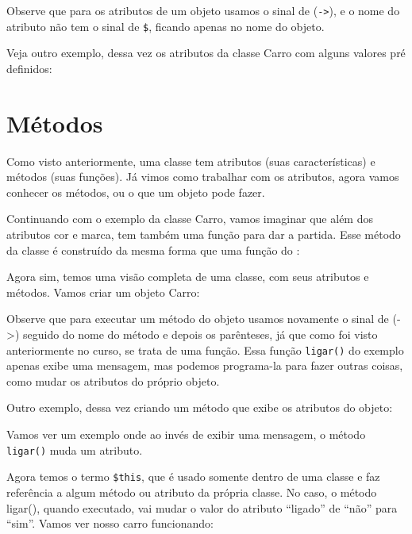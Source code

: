 Observe que para os atributos de um objeto usamos o sinal de (\texttt{->}), e o nome do 
atributo não tem o sinal de \texttt{\$}, ficando apenas no nome do objeto. 

Veja outro exemplo, dessa vez os atributos da classe Carro com alguns valores pré definidos:



\section{Métodos}
\label{metodos}

Como visto anteriormente, uma classe tem atributos (suas características) e métodos 
(suas funções). Já vimos como trabalhar com os atributos, agora vamos conhecer os métodos, 
ou o que um objeto pode fazer.

Continuando com o exemplo da classe Carro, vamos imaginar que além dos atributos cor e 
marca, tem também uma função para dar a partida. Esse método da classe é construído da 
mesma forma que uma função do \php:



Agora sim, temos uma visão completa de uma classe, com seus atributos e métodos. Vamos 
criar um objeto Carro:



Observe que para executar um método do objeto usamos novamente o sinal de (->) seguido 
do nome do método e depois os parênteses, já que como foi visto anteriormente no curso,
se trata de uma função. Essa função \texttt{ligar()} do exemplo apenas exibe uma mensagem, 
mas podemos programa-la para fazer outras coisas, como mudar os atributos do próprio objeto. 

Outro exemplo, dessa vez criando um método que exibe os atributos do objeto:



Vamos ver um exemplo onde ao invés de exibir uma mensagem, o método \texttt{ligar()} 
muda um atributo.



Agora temos o termo \texttt{\$this}, que é usado somente dentro de uma classe e faz referência 
a algum método ou atributo da própria classe. No caso, o método ligar(), quando executado, 
vai mudar o valor do atributo ``ligado'' de ``não'' para ``sim''. Vamos ver nosso carro 
funcionando:

